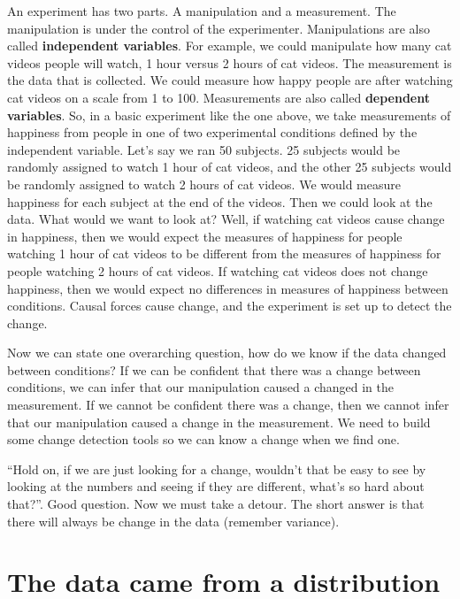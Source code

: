 \documentclass[
]{book}
\begin{document}
An experiment has two parts. A manipulation and a measurement. The manipulation is under the control of the experimenter. Manipulations are also called \textbf{independent variables}. For example, we could manipulate how many cat videos people will watch, 1 hour versus 2 hours of cat videos. The measurement is the data that is collected. We could measure how happy people are after watching cat videos on a scale from 1 to 100. Measurements are also called \textbf{dependent variables}. So, in a basic experiment like the one above, we take measurements of happiness from people in one of two experimental conditions defined by the independent variable. Let's say we ran 50 subjects. 25 subjects would be randomly assigned to watch 1 hour of cat videos, and the other 25 subjects would be randomly assigned to watch 2 hours of cat videos. We would measure happiness for each subject at the end of the videos. Then we could look at the data. What would we want to look at? Well, if watching cat videos cause change in happiness, then we would expect the measures of happiness for people watching 1 hour of cat videos to be different from the measures of happiness for people watching 2 hours of cat videos. If watching cat videos does not change happiness, then we would expect no differences in measures of happiness between conditions. Causal forces cause change, and the experiment is set up to detect the change.

Now we can state one overarching question, how do we know if the data changed between conditions? If we can be confident that there was a change between conditions, we can infer that our manipulation caused a changed in the measurement. If we cannot be confident there was a change, then we cannot infer that our manipulation caused a change in the measurement. We need to build some change detection tools so we can know a change when we find one.

``Hold on, if we are just looking for a change, wouldn't that be easy to see by looking at the numbers and seeing if they are different, what's so hard about that?''. Good question. Now we must take a detour. The short answer is that there will always be change in the data (remember variance).

\hypertarget{the-data-came-from-a-distribution}{%
\section{The data came from a distribution}\label{the-data-came-from-a-distribution}}
\end{document}
